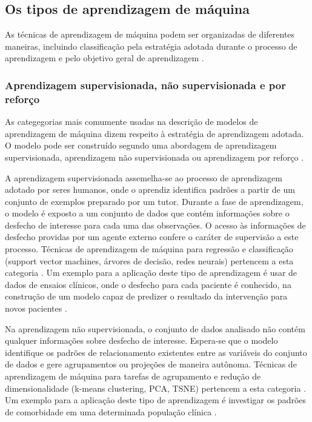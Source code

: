 \subsection{Os tipos de aprendizagem de máquina}
As técnicas de aprendizagem de máquina podem ser organizadas de diferentes maneiras, incluindo classificação pela estratégia adotada durante o processo
de aprendizagem e pelo objetivo geral de aprendizagem \cite{Theobald2021, Ng2001}.

\subsubsection{Aprendizagem supervisionada, não supervisionada e por reforço}
As categegorias mais comumente usadas na descrição de modelos de aprendizagem de máquina dizem respeito à estratégia de aprendizagem adotada. O
modelo pode ser construído segundo uma abordagem de aprendizagem supervisionada, aprendizagem não supervisionada ou aprendizagem por reforço
\cite{Theobald2021, Bi2019}.

A aprendizagem supervisionada assemelha-se ao processo de aprendizagem adotado por seres humanos, onde o aprendiz identifica padrões a partir de
um conjunto de exemplos preparado por um tutor. Durante a fase de aprendizagem, o modelo é exposto a um conjunto de dados que contém informações
sobre o desfecho de interesse para cada uma das observações. O acesso às informações de desfecho providas por um agente externo confere o caráter
de supervisão a este processo. Técnicas de aprendizagem de máquina para regressão e classificação (support vector machines, árvores de decisão,
redes neurais) pertencem a esta categoria \cite{Theobald2021, Bi2019}. Um exemplo para a aplicação deste tipo de aprendizagem é usar de dados de
ensaios clínicos, onde o desfecho para cada paciente é conhecido, na construção de um modelo capaz de predizer o resultado da intervenção para
novos pacientes \cite{Collins2023}.

Na aprendizagem não supervisionada, o conjunto de dados analisado não contém qualquer informações sobre desfecho de interesse. Espera-se que o modelo
identifique os padrões de relacionamento existentes entre as variáveis do conjunto de dados e gere agrupamentos ou projeções de maneira autônoma.
Técnicas de aprendizagem de máquina para tarefas de agrupamento e redução de dimensionalidade (k-means clustering, PCA, TSNE) pertencem a esta categoria
\cite{Theobald2021, Bi2019}. Um exemplo para a aplicação deste tipo de aprendizagem é investigar os padrões de comorbidade em uma determinada população
clínica \cite{Sanchez2019}.

